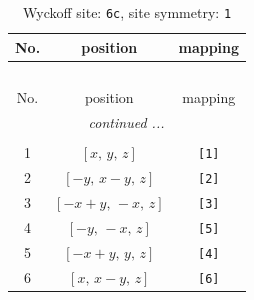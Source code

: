 \documentclass[fleqn,8pt]{jsarticle}
\begin{document}
\begin{longtable}{ccc}
\caption{Wyckoff site: {\tt 6c}, site symmetry: {\tt 1}}
 \\
 \hline \hline
No. & position & mapping \\ \hline \endfirsthead

\multicolumn{2}{l}{\tablename\ \thetable{}} \\
 \hline \hline
No. & position & mapping \\ \hline \endhead

 \hline \hline
\multicolumn{2}{r}{\footnotesize\it continued ...} \\ \endfoot

 \hline \hline
\multicolumn{2}{r}{} \\ \endlastfoot

1 & $\left[ x,\, y,\, z \right]$ & {\tt [1]} \\ \hline
2 & $\left[ - y,\, x - y,\, z \right]$ & {\tt [2]} \\ \hline
3 & $\left[ - x + y,\, - x,\, z \right]$ & {\tt [3]} \\ \hline
4 & $\left[ - y,\, - x,\, z \right]$ & {\tt [5]} \\ \hline
5 & $\left[ - x + y,\, y,\, z \right]$ & {\tt [4]} \\ \hline
6 & $\left[ x,\, x - y,\, z \right]$ & {\tt [6]} \\
\end{longtable}
\end{document}
